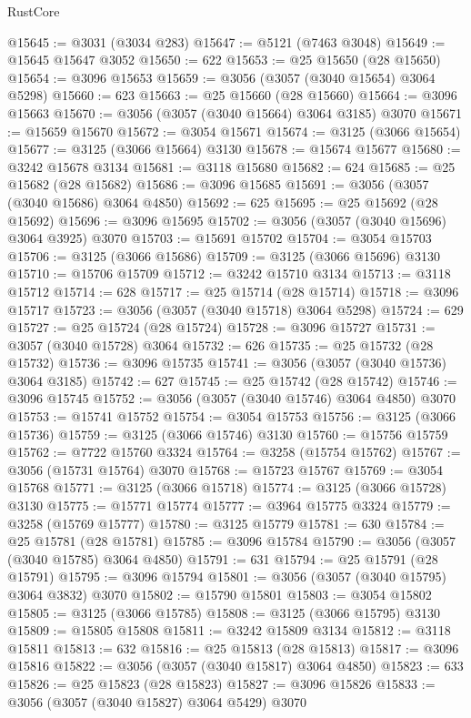 \begin{lexlean}{RustCore}
\begin{coremodule}
@15645 := @3031 (@3034 @283)
@15647 := @5121 (@7463 @3048)
@15649 := @15645 @15647 @3052
@15650 := 622
@15653 := @25 @15650 (@28 @15650)
@15654 := @3096 @15653
@15659 := @3056 (@3057 (@3040 @15654) @3064 @5298)
@15660 := 623
@15663 := @25 @15660 (@28 @15660)
@15664 := @3096 @15663
@15670 := @3056 (@3057 (@3040 @15664) @3064 @3185) @3070
@15671 := @15659 @15670
@15672 := @3054 @15671
@15674 := @3125 (@3066 @15654)
@15677 := @3125 (@3066 @15664) @3130
@15678 := @15674 @15677
@15680 := @3242 @15678 @3134
@15681 := @3118 @15680
@15682 := 624
@15685 := @25 @15682 (@28 @15682)
@15686 := @3096 @15685
@15691 := @3056 (@3057 (@3040 @15686) @3064 @4850)
@15692 := 625
@15695 := @25 @15692 (@28 @15692)
@15696 := @3096 @15695
@15702 := @3056 (@3057 (@3040 @15696) @3064 @3925) @3070
@15703 := @15691 @15702
@15704 := @3054 @15703
@15706 := @3125 (@3066 @15686)
@15709 := @3125 (@3066 @15696) @3130
@15710 := @15706 @15709
@15712 := @3242 @15710 @3134
@15713 := @3118 @15712
@15714 := 628
@15717 := @25 @15714 (@28 @15714)
@15718 := @3096 @15717
@15723 := @3056 (@3057 (@3040 @15718) @3064 @5298)
@15724 := 629
@15727 := @25 @15724 (@28 @15724)
@15728 := @3096 @15727
@15731 := @3057 (@3040 @15728) @3064
@15732 := 626
@15735 := @25 @15732 (@28 @15732)
@15736 := @3096 @15735
@15741 := @3056 (@3057 (@3040 @15736) @3064 @3185)
@15742 := 627
@15745 := @25 @15742 (@28 @15742)
@15746 := @3096 @15745
@15752 := @3056 (@3057 (@3040 @15746) @3064 @4850) @3070
@15753 := @15741 @15752
@15754 := @3054 @15753
@15756 := @3125 (@3066 @15736)
@15759 := @3125 (@3066 @15746) @3130
@15760 := @15756 @15759
@15762 := @7722 @15760 @3324
@15764 := @3258 (@15754 @15762)
@15767 := @3056 (@15731 @15764) @3070
@15768 := @15723 @15767
@15769 := @3054 @15768
@15771 := @3125 (@3066 @15718)
@15774 := @3125 (@3066 @15728) @3130
@15775 := @15771 @15774
@15777 := @3964 @15775 @3324
@15779 := @3258 (@15769 @15777)
@15780 := @3125 @15779
@15781 := 630
@15784 := @25 @15781 (@28 @15781)
@15785 := @3096 @15784
@15790 := @3056 (@3057 (@3040 @15785) @3064 @4850)
@15791 := 631
@15794 := @25 @15791 (@28 @15791)
@15795 := @3096 @15794
@15801 := @3056 (@3057 (@3040 @15795) @3064 @3832) @3070
@15802 := @15790 @15801
@15803 := @3054 @15802
@15805 := @3125 (@3066 @15785)
@15808 := @3125 (@3066 @15795) @3130
@15809 := @15805 @15808
@15811 := @3242 @15809 @3134
@15812 := @3118 @15811
@15813 := 632
@15816 := @25 @15813 (@28 @15813)
@15817 := @3096 @15816
@15822 := @3056 (@3057 (@3040 @15817) @3064 @4850)
@15823 := 633
@15826 := @25 @15823 (@28 @15823)
@15827 := @3096 @15826
@15833 := @3056 (@3057 (@3040 @15827) @3064 @5429) @3070

\end{coremodule}
\end{lexlean}
